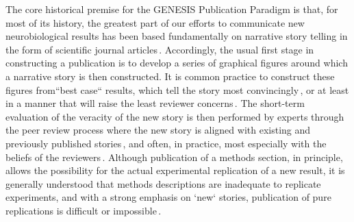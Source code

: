 \documentclass[12pt]{article}
\begin{document}
The core historical premise for the GENESIS Publication Paradigm is that, for most of its history, the greatest part of our efforts to communicate new neurobiological results has been based fundamentally on narrative story telling in the form of scientific journal articles\,\cite{Gibson:2004vn}.  Accordingly, the usual first stage in constructing a publication is to develop a series of graphical figures around which a narrative story is then constructed.  It is common practice to construct these figures from``best case`` results, which tell the story most convincingly\,\cite{Cohen:2009ys}, or at least in a manner that will raise the least reviewer concerns\,\cite{Sauerbrei:2009zr}.  The short-term evaluation of the veracity of the new story is then performed by experts through the peer review process where the new story is aligned with existing and previously published stories\,\cite{Brender:2009ly, Foote:2009ve}, and often, in practice, most especially with the beliefs of the reviewers\,\cite{Perneger:2010qf, Roberts:2009bh}. Although publication of a methods section, in principle, allows the possibility for the actual experimental replication of a new result, it is generally understood that methods descriptions are inadequate to replicate experiments, and with a strong emphasis on `new` stories, publication of pure replications is difficult or impossible\,\cite{Wyness:2009dq}.  
\end{document}
